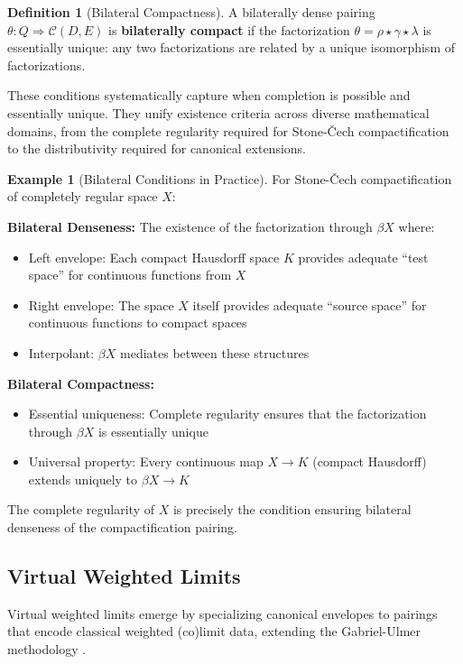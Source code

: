 \documentclass[11pt]{article}
\theoremstyle{plain}
\theoremstyle{definition}
\newtheorem{definition}[theorem]{Definition}
\newtheorem{example}[theorem]{Example}
\theoremstyle{remark}
\newcommand{\C}{\mathcal{C}}
\begin{document}
\begin{definition}[Bilateral Compactness]
A bilaterally dense pairing $\theta : Q \Rightarrow \C(D, E)$ is \textbf{bilaterally compact} if the factorization $\theta = \rho \star \gamma \star \lambda$ is essentially unique: any two factorizations are related by a unique isomorphism of factorizations.
\end{definition}

These conditions systematically capture when completion is possible and essentially unique. They unify existence criteria across diverse mathematical domains, from the complete regularity required for Stone-\v{C}ech compactification to the distributivity required for canonical extensions.

\begin{example}[Bilateral Conditions in Practice]
For Stone-\v{C}ech compactification of completely regular space $X$:

\textbf{Bilateral Denseness:} The existence of the factorization through $\beta X$ where:
\begin{itemize}
\item Left envelope: Each compact Hausdorff space $K$ provides adequate ``test space'' for continuous functions from $X$
\item Right envelope: The space $X$ itself provides adequate ``source space'' for continuous functions to compact spaces  
\item Interpolant: $\beta X$ mediates between these structures
\end{itemize}

\textbf{Bilateral Compactness:}
\begin{itemize}
\item Essential uniqueness: Complete regularity ensures that the factorization through $\beta X$ is essentially unique
\item Universal property: Every continuous map $X \to K$ (compact Hausdorff) extends uniquely to $\beta X \to K$
\end{itemize}

The complete regularity of $X$ is precisely the condition ensuring bilateral denseness of the compactification pairing.
\end{example}

\subsection{Virtual Weighted Limits}

Virtual weighted limits emerge by specializing canonical envelopes to pairings that encode classical weighted (co)limit data, extending the Gabriel-Ulmer methodology \cite{gabriel1971lokal}.
\end{document}
